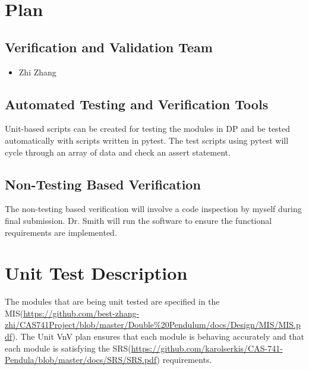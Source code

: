 \documentclass[12pt, titlepage]{article}
\begin{document}
\begin{comment}
\wss{What modules are outside of the scope.  If there are modules that are
  developed by someone else, then you would say here if you aren't planning on
  verifying them.  There may also be modules that are part of your software, but
  have a lower priority for verification than others.  If this is the case,
  explain your rationale for the ranking of module importance.}
\end{comment}
\section{Plan}
	
\subsection{Verification and Validation Team}

\begin{itemize}
  \item Zhi Zhang

\end{itemize}

\subsection{Automated Testing and Verification Tools}

Unit-based scripts can be created for testing the modules in DP and be tested automatically with scripts written in pytest. The test scripts using pytest will cycle through an array of data and check an assert statement.  
\subsection{Non-Testing Based Verification}
The non-testing based verification will involve a code inspection by myself during final submission. Dr. Smith will run the software to ensure the functional requirements are implemented.  
 
\section{Unit Test Description}
The modules that are being unit tested are specified in the MIS(\url{https://github.com/best-zhang-zhi/CAS741Project/blob/master/Double%20Pendulum/docs/Design/MIS/MIS.pdf}). The Unit VnV plan ensures that each module is behaving accurately and that each module is satisfying the SRS(\url{https://github.com/karolserkis/CAS-741-Pendula/blob/master/docs/SRS/SRS.pdf}) requirements. 
 
\end{document}
